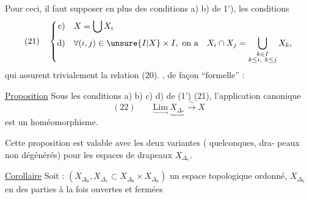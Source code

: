 Pour ceci, il faut supposer en plus des
conditions a) b) de 1'), les conditions
\[
(21)\quad\left\{\begin{aligned}
\text{c)}\quad&X=\bigcup X_i\\
\text{d)}\quad&\forall(i,j)\in\unsure{I|X}\times I,\ \text{on a}\quad
X_i\cap X_j=\bigcup_{\substack{k\in I\\k\leq i,\ k\leq j}}X_k,
\end{aligned}\right.
\]
qui assurent trivialement la relation (20).
, de façon  ``formelle'' :

\uline{Proposition} Sous les conditions a) b) c) d)
de (1') (21), l'application canonique
\[
(22)\qquad\underset{\longrightarrow}{\mathrm{Lim}}\ \underbrace{X_{\Delta_*}}\xrightarrow{\sim}X
\]
est un homéomorphisme.

Cette proposition est valable avec les
deux variantes ( quelconques, dra-
peaux non dégénérés) pour les
espaces de drapeaux $X_{\Delta_r}$.

\uline{Corollaire} Soit : $(X_{\Delta_0},X_{\Delta_1}\subset X_{\Delta_0}\times X_{\Delta_0})$
un espace topologique ordonné, 
  $X_{\Delta_0}$ en des parties à la fois ouvertes et fermées
